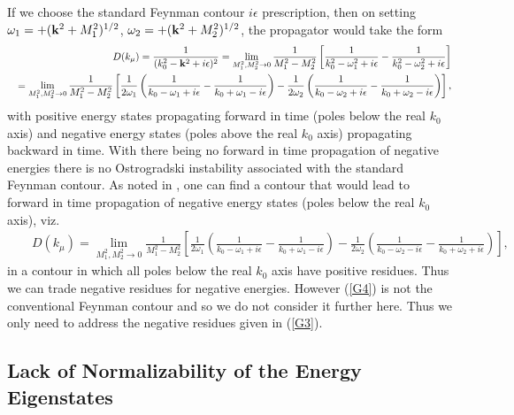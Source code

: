 \documentclass[aps]{revtex4}
\begin{document}
If we choose the standard Feynman contour $i\epsilon$ prescription, then on setting  $\omega_1=+({\bf k}^2 +M_1^2)^{1/2}$, $\omega_2=+({\bf k}^2 +M_2^2)^{1/2}$, the propagator would take the form  
%
\begin{eqnarray}
&&D(k_{\mu})=\frac{1}{(k_0^2-{\bf k}^2+i\epsilon)^2}=\lim_{M_1^2,M_2^2\rightarrow 0} \frac{1}{M_1^2-M_2^2}\left[\frac{1}{k_0^2-\omega_1^2+i\epsilon}-\frac{1}{k_0^2-\omega_2^2+i\epsilon}\right]
\nonumber\\
&&=\lim_{M_1^2,M_2^2\rightarrow 0} \frac{1}{M_1^2-M_2^2}\left[
\frac{1}{2\omega_1}\left(\frac{1}{k_0-\omega_1+i\epsilon}-\frac{1}{k_0+\omega_1-i\epsilon}\right)
-\frac{1}{2\omega_2}\left(\frac{1}{k_0-\omega_2+i\epsilon}-\frac{1}{k_0+\omega_2-i\epsilon}\right)
\right],
\label{G3}
\end{eqnarray}
%
with positive energy states propagating forward in time (poles below the real $k_0$ axis) and negative energy states  (poles above the real $k_0$ axis) propagating backward in time. With there being no forward in time propagation of negative energies there is no Ostrogradski instability associated with the standard Feynman contour. As noted in \cite{Bender2008b}, one can find a contour that would lead to forward in time propagation of negative energy states (poles below the real $k_0$ axis), viz.  
%
\begin{eqnarray}
&&D(k_{\mu})=\lim_{M_1^2,M_2^2\rightarrow 0} \frac{1}{M_1^2-M_2^2}\left[
\frac{1}{2\omega_1}\left(\frac{1}{k_0-\omega_1+i\epsilon}-\frac{1}{k_0+\omega_1-i\epsilon}\right)
-\frac{1}{2\omega_2}\left(\frac{1}{k_0-\omega_2-i\epsilon}-\frac{1}{k_0+\omega_2+i\epsilon}\right)
\right],~~~
\label{G4}
\end{eqnarray}
%
in a contour in which all poles below the real $k_0$ axis have positive residues. Thus we can trade negative residues for negative energies. However (\ref{G4}) is not the conventional Feynman contour and so we do not consider it further here. Thus we only need to address the negative residues given in (\ref{G3}).

\subsection{Lack of Normalizability of the Energy Eigenstates}
\end{document}
